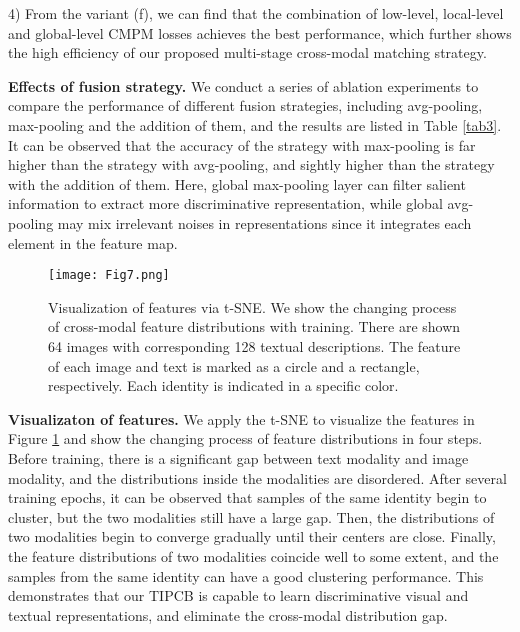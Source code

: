 \documentclass[review]{elsarticle}
\begin{document}
4)	From the variant (f), we can find that the combination of low-level, local-level and global-level CMPM losses achieves the best performance, which further shows the high efficiency of our proposed multi-stage cross-modal matching strategy.

\textbf{Effects of fusion strategy.} We conduct a series of ablation experiments to compare the performance of different fusion strategies, including avg-pooling, max-pooling and the addition of them, and the results are listed in Table \ref{tab3}. It can be observed that the accuracy of the strategy with max-pooling is far higher than the strategy with avg-pooling, and sightly higher than the strategy with the addition of them. Here, global max-pooling layer can filter salient information to extract more discriminative representation, while global avg-pooling may mix irrelevant noises in representations since it integrates each element in the feature map.

\begin{table}[!t]
\caption{Comparable results of different fusion strategies. Top-1, Top-5 and Top-10 accuracies (\%) are reported.} 
\centering
\label{tab3}
\end{table}

\begin{figure}[!t]
\centering
\texttt{[image: Fig7.png]}\\
\caption{Visualization of features via t-SNE. We show the changing process of cross-modal feature distributions with training. There are shown 64 images with corresponding 128 textual descriptions. The feature of each image and text is marked as a circle and a rectangle, respectively. Each identity is indicated in a specific color.}
\label{fig7}
\end{figure}

\textbf{Visualizaton of features.} We apply the t-SNE \cite{52} to visualize the features in Figure \ref{fig7} and show the changing process of feature distributions in four steps. Before training, there is a significant gap between text modality and image modality, and the distributions inside the modalities are disordered. After several training epochs, it can be observed that samples of the same identity begin to cluster, but the two modalities still have a large gap. Then, the distributions of two modalities begin to converge gradually until their centers are close. Finally, the feature distributions of two modalities coincide well to some extent, and the samples from the same identity can have a good clustering performance. This demonstrates that our TIPCB is capable to learn discriminative visual and textual representations, and eliminate the cross-modal distribution gap.
\end{document}
